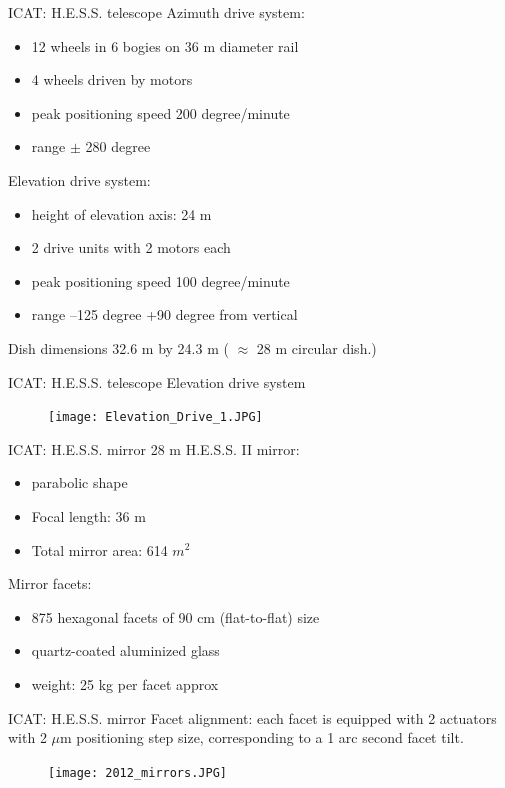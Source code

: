 \documentclass{beamer}
\begin{document}
\begin{frame}{ICAT: H.E.S.S. telescope}
	Azimuth drive system:
	\begin{itemize}
		\item 12 wheels in 6 bogies on 36 m diameter rail
		\item 4 wheels driven by motors
		\item peak positioning speed 200 degree/minute
		\item range $\pm$ 280 degree
	\end{itemize}
	\hfill \break
	Elevation drive system:
	\begin{itemize}
		\item height of elevation axis: 24 m
		\item 2 drive units with 2 motors each
		\item peak positioning speed 100 degree/minute
		\item range –125 degree +90 degree from vertical
	\end{itemize}
	\hfill \break
	Dish dimensions 32.6 m by 24.3 m ( $\approx$ 28 m circular dish.)
\end{frame}

\begin{frame}{ICAT: H.E.S.S. telescope}
	Elevation drive system
	\begin{figure}[h]
		\texttt{[image: Elevation\_Drive\_1.JPG]}
	\end{figure}
\end{frame}

\begin{frame}{ICAT: H.E.S.S. mirror}
	28 m H.E.S.S. II mirror:
	\begin{itemize}
		\item parabolic shape
		\item Focal length: 36 m
		\item Total mirror area: 614 $m^2$
	\end{itemize}
	\hfill \break
	Mirror facets:
	\begin{itemize}
		\item 875 hexagonal facets of 90 cm (flat-to-flat) size
		\item quartz-coated aluminized glass
		\item weight: 25 kg per facet approx
	\end{itemize}
\end{frame}

\begin{frame}{ICAT: H.E.S.S. mirror}
	Facet alignment: each facet is equipped with 2 actuators with 2 $\mu\text{m}$ positioning step size, corresponding to a 1 arc second facet tilt.
	\begin{figure}[h]
		\texttt{[image: 2012\_mirrors.JPG]}
	\end{figure}
\end{frame}
\end{document}
